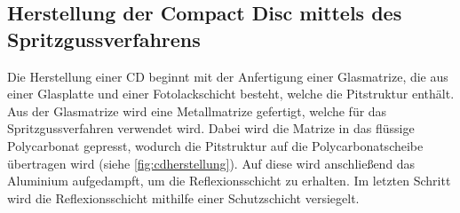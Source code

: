 \subsection{Herstellung der Compact Disc mittels des Spritzgussverfahrens}
\label{subsec:cdherstellung}

Die Herstellung einer CD beginnt mit der Anfertigung einer Glasmatrize, die aus
einer Glasplatte und einer Fotolackschicht besteht, welche die Pitstruktur
enthält. Aus der Glasmatrize wird eine Metallmatrize gefertigt, welche für das
Spritzgussverfahren verwendet wird. Dabei wird die Matrize in das flüssige
Polycarbonat gepresst, wodurch die Pitstruktur auf die Polycarbonatscheibe
übertragen wird (siehe \autoref{fig:cdherstellung}). Auf diese wird anschließend
das Aluminium aufgedampft, um die Reflexionsschicht zu erhalten. Im letzten
Schritt wird die Reflexionsschicht mithilfe einer Schutzschicht versiegelt.
\cite{cdp}


